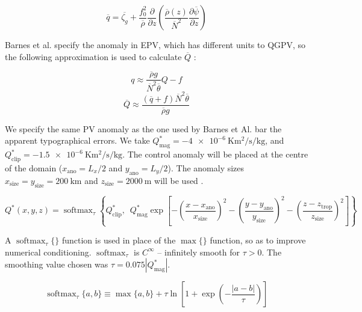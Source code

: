 \documentclass{article}
\begin{document}
\begin{equation}\label{q_bar}
    \overline q = \overline{\zeta_g} + \frac{f_0^2}{\overline{\rho}} \frac{\partial}{\partial z} \left( \frac{\overline{\rho}(z)}{\overline{N}^2}  \frac{\partial \overline\psi}{\partial z} \right)
\end{equation}

Barnes et al. specify the anomaly in EPV, which has different units to QGPV, so the following approximation is used to calculate $\overline{Q}$ \cite{fehlmann1997pvelements}:

\begin{equation}\label{Q_to_q_conversion}
    q \approx \frac{\overline{\rho} g}{\overline{N}^2 \overline{\theta}} Q - f
\end{equation}
\begin{equation}\label{Q_bar}
    \overline{Q} \approx \frac{\left( \overline q + f\right)\overline{N}^2 \overline{\theta}}{\overline{\rho} g}
\end{equation}

We specify the same PV anomaly as the one used by Barnes et Al. \cite{Barnes2022main} bar the apparent typographical errors.
We take $Q^*_\text{mag} = \qty{-4e-6}{\kelvin \meter \squared \per \second \per \kg}$, and $Q^*_\text{clip} = \qty{-1.5e-6}{\kelvin \meter \squared \per \second \per \kg}$.
The control anomaly will be placed at the centre of the domain ($x_\text{ano} = L_x/2$ and $y_\text{ano} = L_y/2$).
The anomaly sizes $x_\text{size} = y_\text{size} = \qty{200}{\km}$ and $z_\text{size} = \qty{2000}{\meter}$ will be used \cite{Barnes2022main}.

\begin{equation}\label{Q_star}
    Q^*(x,y,z) = \operatorname{softmax}_\tau\left\{Q^*_\text{clip}, \enspace Q^*_\text{mag} \exp \left[- \left(\frac{x - x_\text{ano}}{x_\text{size}}\right)^2 - \left(\frac{y - y_\text{ano}}{y_\text{size}}\right)^2 - \left(\frac{z - z_\text{trop}}{z_\text{size}}\right)^2\right]\right\}
\end{equation}

A $\operatorname{softmax}_\tau \{\}$ function is used in place of the $\max\{\}$ function, so as to improve numerical conditioning.
$\operatorname{softmax}_\tau$ is $C^\infty$ -- infinitely smooth for $\tau>0$.
The smoothing value chosen was $\tau=\displaystyle 0.075 |Q^*_\text{mag}|$.

\begin{equation}
    \operatorname{softmax}_\tau \{a,b\} \equiv \max \{a,b\} + \tau \ln \left[1+\exp \left(- \frac{|a-b|}{\tau} \right)\right]
\end{equation}
\end{document}

